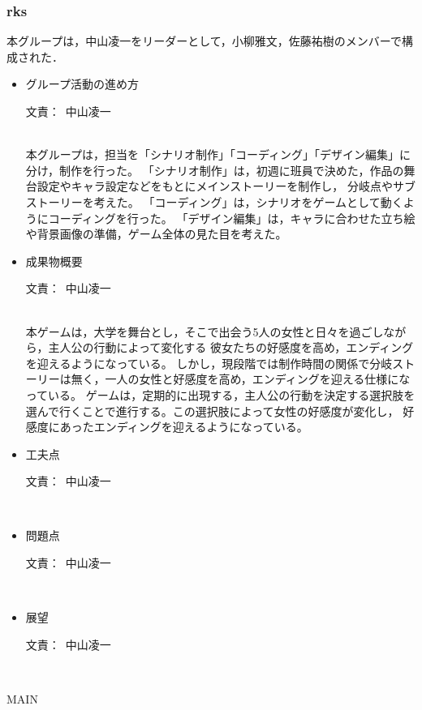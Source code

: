 \documentclass[a4paper]{jarticle}
\newcommand{\resp}[1]{\begin{flushright}文責：~#1\end{flushright}~\\}
\begin{document}
\fi

\subsubsection{rks}
    
    本グループは，中山凌一をリーダーとして，小柳雅文，佐藤祐樹のメンバーで構成された．

    \begin{itemize}
        \item グループ活動の進め方
        
        \resp{中山凌一}

        本グループは，担当を「シナリオ制作」「コーディング」「デザイン編集」に分け，制作を行った。
        「シナリオ制作」は，初週に班員で決めた，作品の舞台設定やキャラ設定などをもとにメインストーリーを制作し，
        分岐点やサブストーリーを考えた。
        「コーディング」は，シナリオをゲームとして動くようにコーディングを行った。
        「デザイン編集」は，キャラに合わせた立ち絵や背景画像の準備，ゲーム全体の見た目を考えた。

        \item 成果物概要
        
        \resp{中山凌一}

        本ゲームは，大学を舞台とし，そこで出会う5人の女性と日々を過ごしながら，主人公の行動によって変化する
        彼女たちの好感度を高め，エンディングを迎えるようになっている。
        しかし，現段階では制作時間の関係で分岐ストーリーは無く，一人の女性と好感度を高め，エンディングを迎える仕様になっている。
        ゲームは，定期的に出現する，主人公の行動を決定する選択肢を選んで行くことで進行する。この選択肢によって女性の好感度が変化し，
        好感度にあったエンディングを迎えるようになっている。

        \item 工夫点
        
        \resp{中山凌一}


        \item 問題点
        
        \resp{中山凌一}


        \item 展望
        
        \resp{中山凌一}


    \end{itemize}

\expandafter\ifx\csname MAIN \endcsname\relax
  
\end{document}
